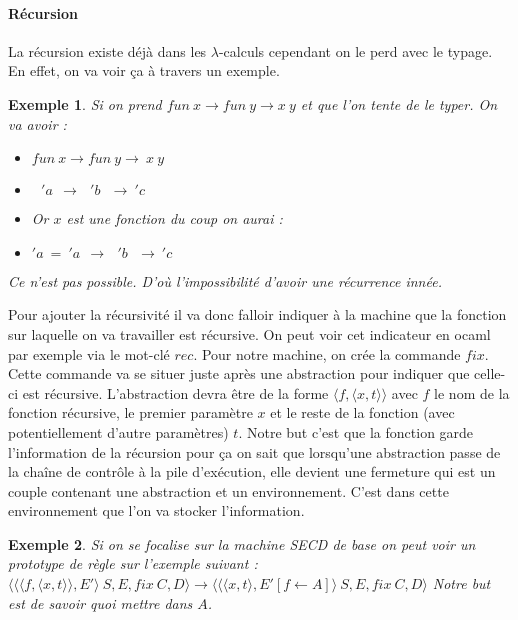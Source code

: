 \documentclass[10pt,a4paper]{report}
\newtheorem{ex}{Exemple}
\begin{document}
	\paragraph{Récursion } La récursion existe déjà dans les $\lambda$-calculs cependant on le perd avec le typage. En effet, on va voir ça à travers un exemple.
	
	\begin{ex}
		Si on prend $fun~x \rightarrow fun~y \rightarrow x~y$ et que l'on tente de le typer. On va avoir :
		\smallbreak
		\begin{itemize}
			\item[-] $fun~x \rightarrow fun~y \rightarrow~x~y$
			\item[-] $~~~'a~~\rightarrow ~~~'b~~~\rightarrow~'c$
			\item[] Or $x$ est une fonction du coup on aurai :
			\item[-] $'a~=~'a~~\rightarrow ~~~'b~~~\rightarrow~'c$
		\end{itemize} 
		Ce n'est pas possible. D'où l'impossibilité d'avoir une récurrence innée. 
	\end{ex}

	Pour ajouter la récursivité il va donc falloir indiquer à la machine que la fonction sur laquelle on va travailler est récursive. On peut voir cet indicateur en ocaml par exemple via le mot-clé $rec$. Pour notre machine, on crée la commande $fix$. Cette commande va se situer juste après une abstraction pour indiquer que celle-ci est récursive. L'abstraction devra être de la forme $\langle f,\langle x,t\rangle\rangle$ avec $f$ le nom de la fonction récursive, le premier paramètre $x$ et le reste de la fonction (avec potentiellement d'autre paramètres) $t$. Notre but c'est que la fonction garde l'information de la récursion pour ça on sait que lorsqu'une abstraction passe de la chaîne de contrôle à la pile d'exécution, elle devient une fermeture qui est un couple contenant une abstraction et un environnement. C'est dans cette environnement que l'on va stocker l'information.
	
	\begin{ex}
		Si on se focalise sur la machine SECD de base on peut voir un prototype de règle sur l'exemple suivant :
		\smallbreak
		$\langle \langle\langle f,\langle x,t\rangle\rangle,E'\rangle~S,E,fix~C,D\rangle
		\longrightarrow \langle \langle \langle x,t\rangle,E'[f \leftarrow A]\rangle~S,E,fix~C,D\rangle$
		\medbreak
		Notre but est de savoir quoi mettre dans $A$. 
	\end{ex} 
\end{document}
